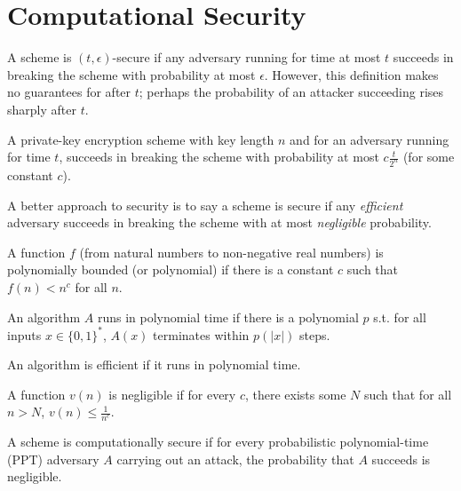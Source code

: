 \section{Computational Security}

A scheme is $(t, \epsilon)$-secure if any 
adversary running for time at most $t$ succeeds 
in breaking the scheme with probability at most 
$\epsilon$. However, this definition makes 
no guarantees for after $t$; perhaps the probability
of an attacker succeeding rises sharply after $t$. 

A private-key encryption scheme with key length 
$n$ and for an adversary running
for time $t$, succeeds in breaking the scheme 
with probability at most $c \frac{t}{2^n}$ (for
some constant $c$).

A better approach to security is to say a scheme 
is secure if any \emph{efficient} adversary succeeds in breaking the scheme with at
most \emph{negligible} probability. 

A function $f$ (from natural numbers to non-negative real numbers) 
is polynomially bounded (or polynomial) if there is a constant $c$ 
such that $f(n) < n^c$ for all $n$.

An algorithm $A$ runs in polynomial time if there is a 
polynomial $p$ s.t. for all inputs
$x \in \{0, 1\}^*$, $A(x)$ terminates within $p(|x|)$ steps.

An algorithm is efficient if it runs in polynomial time. 

A function $v(n)$ is negligible if for every $c$, there exists some 
$N$ such that for all $n > N$, $v(n) \leq \frac{1}{n^c}$. 

A scheme is computationally secure if for every 
probabilistic polynomial-time (PPT) adversary $A$
carrying out an attack, the probability that $A$ 
succeeds is negligible. 